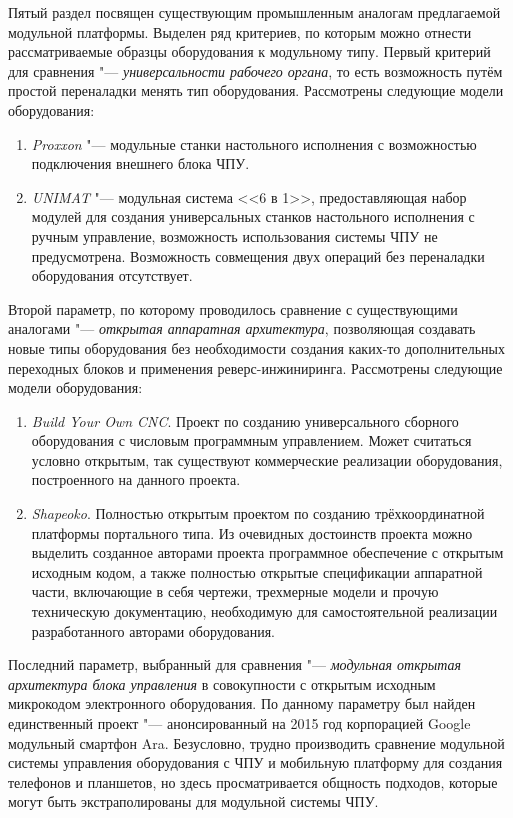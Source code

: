 Пятый раздел посвящен существующим промышленным аналогам предлагаемой модульной платформы. Выделен ряд критериев, по которым можно отнести рассматриваемые образцы оборудования к модульному типу. Первый критерий для сравнения "--- \textit{универсальности рабочего органа}, то есть возможность путём простой переналадки менять тип оборудования. Рассмотрены следующие модели оборудования: 

\begin{enumerate}
	\item\textit{Proxxon} "--- модульные станки настольного исполнения с возможностью подключения внешнего блока ЧПУ.
	\item\textit{UNIMAT} "--- модульная система <<6 в 1>>, предоставляющая набор модулей для создания универсальных станков настольного исполнения с ручным управление, возможность использования системы ЧПУ не предусмотрена. Возможность совмещения двух операций без переналадки оборудования отсутствует.
\end{enumerate}	

Второй параметр, по которому проводилось сравнение с существующими аналогами "--- \textit{открытая аппаратная архитектура}, позволяющая создавать новые типы оборудования без необходимости создания каких-то дополнительных переходных блоков и применения реверс-инжиниринга. Рассмотрены следующие модели оборудования:

\begin{enumerate}
	\item\textit{Build Your Own CNC}. Проект по созданию универсального сборного оборудования с числовым программным управлением. Может считаться условно открытым, так существуют коммерческие реализации оборудования, построенного на данного проекта.
	\item\textit{Shapeoko}. Полностью открытым проектом по созданию трёхкоординатной платформы портального типа. Из очевидных достоинств проекта можно выделить созданное авторами проекта программное обеспечение с открытым исходным кодом, а также полностью открытые спецификации аппаратной части, включающие в себя чертежи, трехмерные модели и прочую техническую документацию, необходимую для самостоятельной реализации разработанного авторами оборудования.
\end{enumerate}

Последний параметр, выбранный для сравнения "--- \textit{модульная открытая архитектура блока управления} в совокупности с открытым исходным микрокодом электронного оборудования. По данному параметру был найден единственный проект "--- анонсированный на 2015 год корпорацией Google модульный смартфон Ara. Безусловно, трудно производить сравнение модульной системы управления оборудования с ЧПУ и мобильную платформу для создания телефонов и планшетов, но здесь просматривается общность подходов, которые могут быть экстраполированы для модульной системы ЧПУ.

